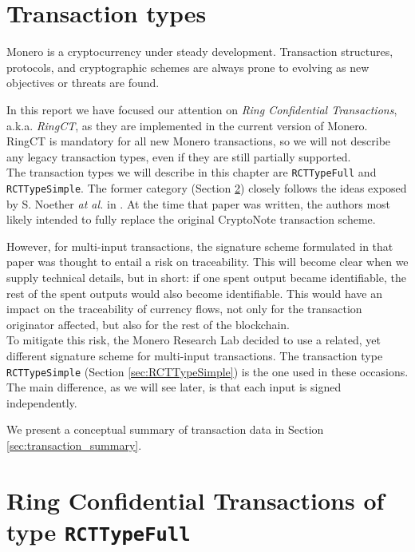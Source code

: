\section{Transaction types}
\label{sec:transaction_types}

Monero is a cryptocurrency under steady development. Transaction structures, protocols, and cryptographic schemes are always prone to evolving as new objectives or threats are found.

In this report we have focused our attention on {\em Ring Confidential Transactions}, a.k.a. {\em RingCT}, as they are implemented in the current version of Monero. RingCT is mandatory for all new Monero transactions, so we will not describe any legacy transaction types, even if they are still partially supported.
\\

The transaction types we will describe in this chapter are {\tt RCTTypeFull} and {\tt RCTTypeSimple}. The former category (Section \ref{sec:RCTTypeFull}) closely follows the ideas exposed by S. Noether {\em at al.} in \cite{ledger34}. At the time that paper was written, the authors most likely intended to fully replace the original CryptoNote transaction scheme.

However, for multi-input transactions, the signature scheme formulated in that paper was thought to entail a risk on traceability. This will become clear when we supply technical details, but in short: if one spent output became identifiable, the rest of the spent outputs would also become identifiable. This would have an impact on the traceability of currency flows, not only for the transaction originator affected, but also for the rest of the blockchain.
\\

To mitigate this risk, the Monero Research Lab decided to use a related, yet different signature scheme for multi-input transactions. The transaction type {\tt RCTTypeSimple} (Section \ref{sec:RCTTypeSimple}) is the one used in these occasions. The main difference, as we will see later, is that each input is signed independently.

We present a conceptual summary of transaction data in Section \ref{sec:transaction_summary}.


\section{Ring Confidential Transactions of type {\tt RCTTypeFull}}
\label{sec:RCTTypeFull}

